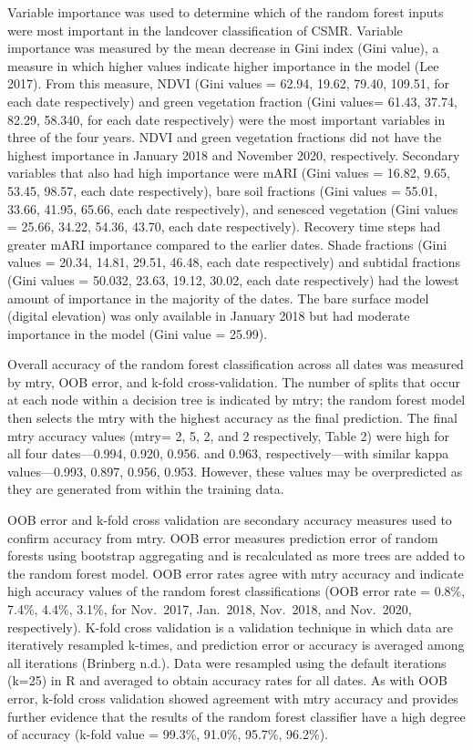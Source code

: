 \documentclass[
]{article}
\begin{document}
Variable importance was used to determine which of the random forest
inputs were most important in the landcover classification of CSMR.
Variable importance was measured by the mean decrease in Gini index
(Gini value), a measure in which higher values indicate higher
importance in the model (Lee 2017). From this measure, NDVI (Gini values
= 62.94, 19.62, 79.40, 109.51, for each date respectively) and green
vegetation fraction (Gini values= 61.43, 37.74, 82.29, 58.340, for each
date respectively) were the most important variables in three of the
four years. NDVI and green vegetation fractions did not have the highest
importance in January 2018 and November 2020, respectively. Secondary
variables that also had high importance were mARI (Gini values = 16.82,
9.65, 53.45, 98.57, each date respectively), bare soil fractions (Gini
values = 55.01, 33.66, 41.95, 65.66, each date respectively), and
senesced vegetation (Gini values = 25.66, 34.22, 54.36, 43.70, each date
respectively). Recovery time steps had greater mARI importance compared
to the earlier dates. Shade fractions (Gini values = 20.34, 14.81,
29.51, 46.48, each date respectively) and subtidal fractions (Gini
values = 50.032, 23.63, 19.12, 30.02, each date respectively) had the
lowest amount of importance in the majority of the dates. The bare
surface model (digital elevation) was only available in January 2018 but
had moderate importance in the model (Gini value = 25.99).

Overall accuracy of the random forest classification across all dates
was measured by mtry, OOB error, and k-fold cross-validation. The number
of splits that occur at each node within a decision tree is indicated by
mtry; the random forest model then selects the mtry with the highest
accuracy as the final prediction. The final mtry accuracy values (mtry=
2, 5, 2, and 2 respectively, Table 2) were high for all four
dates---0.994, 0.920, 0.956. and 0.963, respectively---with similar
kappa values---0.993, 0.897, 0.956, 0.953. However, these values may be
overpredicted as they are generated from within the training data.

OOB error and k-fold cross validation are secondary accuracy measures
used to confirm accuracy from mtry. OOB error measures prediction error
of random forests using bootstrap aggregating and is recalculated as
more trees are added to the random forest model. OOB error rates agree
with mtry accuracy and indicate high accuracy values of the random
forest classifications (OOB error rate = 0.8\%, 7.4\%, 4.4\%, 3.1\%, for
Nov.~2017, Jan.~2018, Nov.~2018, and Nov.~2020, respectively). K-fold
cross validation is a validation technique in which data are iteratively
resampled k-times, and prediction error or accuracy is averaged among
all iterations (Brinberg n.d.). Data were resampled using the default
iterations (k=25) in R and averaged to obtain accuracy rates for all
dates. As with OOB error, k-fold cross validation showed agreement with
mtry accuracy and provides further evidence that the results of the
random forest classifier have a high degree of accuracy (k-fold value =
99.3\%, 91.0\%, 95.7\%, 96.2\%).
\end{document}
